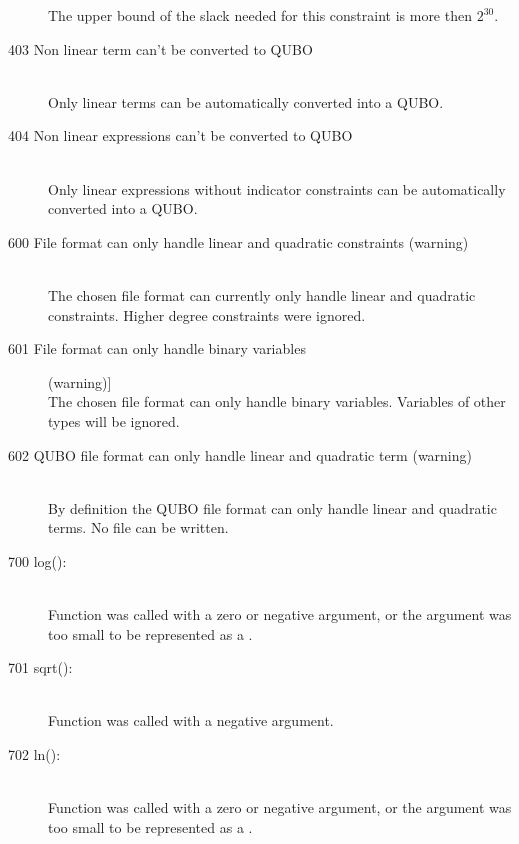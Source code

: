 \begin{description}
   The upper bound of the slack needed for this constraint is more then
   $2^{30}$.   
\item [403 Non linear term can't be converted to QUBO]\ \\
  Only linear terms can be automatically converted into a QUBO.
\item [404 Non linear expressions can't be converted to QUBO]\ \\
  Only linear expressions without indicator constraints can be
  automatically converted into a QUBO. 
\item[600 File format can only handle linear and quadratic constraints
         (warning)]\ \\
  The chosen file format can currently only handle linear and
  quadratic constraints. Higher degree constraints were ignored.
\item[601 File format can only handle binary variables] (warning)]\ \\
  The chosen file format can only handle binary variables. 
  Variables of other types will be ignored.
\item[602 QUBO file format can only handle linear and quadratic term
         (warning)]\ \\
  By definition the QUBO file format can only handle linear and
  quadratic terms. No file can be written.
%
%
% 
%
\item[700 log(): \code{OS specific domain or range error message}]\ \\
  Function  was called with a zero or negative argument, or
the argument was too small to be represented as a .
\item[701 sqrt(): \code{OS specific domain error message}]\ \\
  Function  was called with a negative argument.
\item[702 ln(): \code{OS specific domain or range error message}]\ \\
  Function  was called with a zero or negative argument, or
  the argument was too small to be represented as a .

\end{description}
